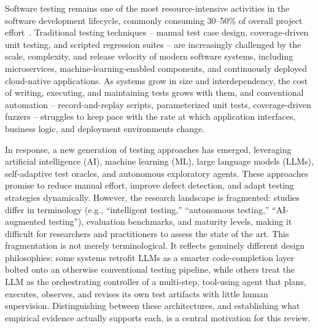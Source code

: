 %

Software testing remains one of the most resource-intensive
activities in the software development lifecycle, commonly consuming
30--50\% of overall project effort~\cite{bluemke2021}. Traditional
testing techniques -- manual test case design, coverage-driven unit
testing, and scripted regression suites -- are increasingly challenged
by the scale, complexity, and release velocity of modern software
systems, including microservices, machine-learning-enabled components,
and continuously deployed cloud-native applications. As systems grow
in size and interdependency, the cost of writing, executing, and
maintaining tests grows with them, and conventional automation --
record-and-replay scripts, parameterized unit tests, coverage-driven
fuzzers -- struggles to keep pace with the rate at which application
interfaces, business logic, and deployment environments change.

In response, a new generation of testing approaches has emerged,
leveraging artificial intelligence (AI), machine learning (ML),
large language models (LLMs), self-adaptive test oracles, and
autonomous exploratory agents. These approaches promise to reduce
manual effort, improve defect detection, and adapt testing strategies
dynamically. However, the research landscape is fragmented: studies
differ in terminology (e.g., ``intelligent testing,'' ``autonomous
testing,'' ``AI-augmented testing''), evaluation benchmarks, and
maturity levels, making it difficult for researchers and practitioners
to assess the state of the art. This fragmentation is not merely
terminological. It reflects genuinely different design philosophies:
some systems retrofit LLMs as a smarter code-completion layer bolted
onto an otherwise conventional testing pipeline, while others treat
the LLM as the orchestrating controller of a multi-step, tool-using
agent that plans, executes, observes, and revises its own test
artifacts with little human supervision. Distinguishing between these
architectures, and establishing what empirical evidence actually
supports each, is a central motivation for this review.

